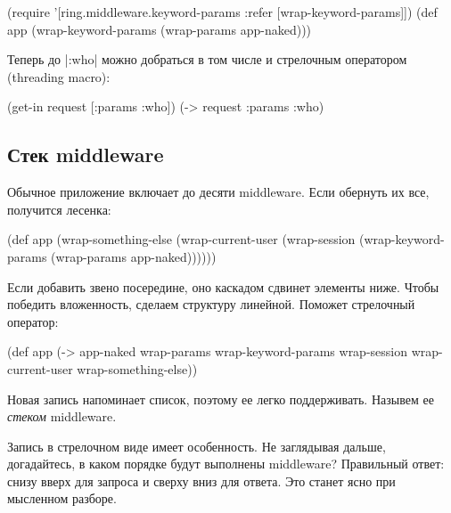 \begin{english}
  \begin{clojure}
(require '[ring.middleware.keyword-params
           :refer [wrap-keyword-params]])
(def app (wrap-keyword-params (wrap-params app-naked)))
  \end{clojure}
\end{english}

Теперь до \spverb|:who| можно добраться в том числе и стрелочным оператором
(threading macro):

\begin{english}
  \begin{clojure}
(get-in request [:params :who])
(-> request :params :who)
  \end{clojure}
\end{english}

\subsection{Стек middleware}

Обычное приложение включает до десяти middleware. Если обернуть их все,
получится лесенка:

\begin{english}
  \begin{clojure}
(def app
  (wrap-something-else
    (wrap-current-user
      (wrap-session
        (wrap-keyword-params
          (wrap-params app-naked))))))
  \end{clojure}
\end{english}

Если добавить звено посередине, оно каскадом сдвинет элементы ниже. Чтобы
победить вложенность, сделаем структуру линейной. Поможет стрелочный оператор:

\begin{english}
  \begin{clojure}
(def app
  (-> app-naked
      wrap-params
      wrap-keyword-params
      wrap-session
      wrap-current-user
      wrap-something-else))
  \end{clojure}
\end{english}

Новая запись напоминает список, поэтому ее легко поддерживать. Назывем ее
\emph{стеком} middleware.

Запись в стрелочном виде имеет особенность. Не заглядывая дальше, догадайтесь, в
каком порядке будут выполнены middleware? Правильный ответ: снизу вверх для
запроса и сверху вниз для ответа. Это станет ясно при мысленном разборе.

